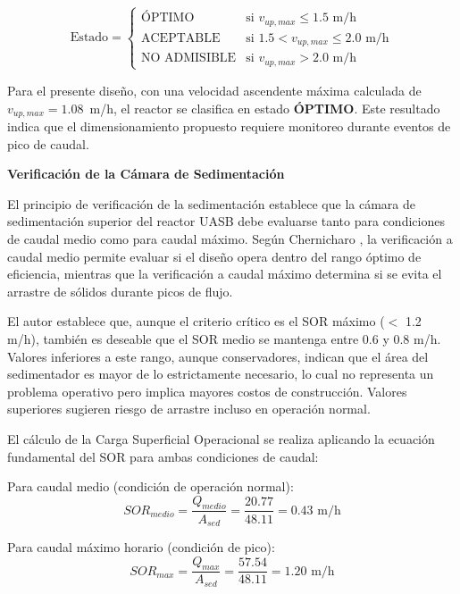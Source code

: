 \documentclass[12pt,a4paper]{article}
\begin{document}
\begin{equation}
\text{Estado} = \begin{cases}
    \text{ÓPTIMO} & \text{si } v_{up,max} \leq 1.5 \text{ m/h} \\
    \text{ACEPTABLE} & \text{si } 1.5 < v_{up,max} \leq 2.0 \text{ m/h} \\
    \text{NO ADMISIBLE} & \text{si } v_{up,max} > 2.0 \text{ m/h}
\end{cases}
\end{equation}

Para el presente diseño, con una velocidad ascendente máxima calculada de $v_{up,max} = 1.08$~m/h, el reactor se clasifica en estado \textbf{ÓPTIMO}. Este resultado indica que el dimensionamiento propuesto requiere monitoreo durante eventos de pico de caudal.

\textbf{Verificación de la Cámara de Sedimentación}

El principio de verificación de la sedimentación establece que la cámara de sedimentación superior del reactor UASB debe evaluarse tanto para condiciones de caudal medio como para caudal máximo. Según Chernicharo \cite{chernicharo2007}, la verificación a caudal medio permite evaluar si el diseño opera dentro del rango óptimo de eficiencia, mientras que la verificación a caudal máximo determina si se evita el arrastre de sólidos durante picos de flujo.

El autor establece que, aunque el criterio crítico es el SOR máximo ($<$ 1.2 m/h), también es deseable que el SOR medio se mantenga entre 0.6 y 0.8 m/h. Valores inferiores a este rango, aunque conservadores, indican que el área del sedimentador es mayor de lo estrictamente necesario, lo cual no representa un problema operativo pero implica mayores costos de construcción. Valores superiores sugieren riesgo de arrastre incluso en operación normal.

El cálculo de la Carga Superficial Operacional se realiza aplicando la ecuación fundamental del SOR para ambas condiciones de caudal:

Para caudal medio (condición de operación normal):
\begin{equation}
SOR_{medio} = \frac{Q_{medio}}{A_{sed}} = \frac{20.77}{48.11} = 0.43 \text{ m/h}
\end{equation}

Para caudal máximo horario (condición de pico):
\begin{equation}
SOR_{max} = \frac{Q_{max}}{A_{sed}} = \frac{57.54}{48.11} = 1.20 \text{ m/h}
\end{equation}
\end{document}
